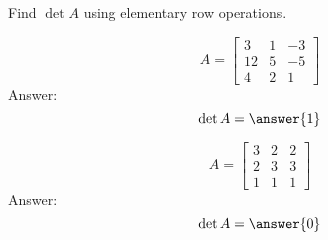 \documentclass{ximera}
\begin{document}
\begin{problem}
Find $\det{A}$ using elementary row operations.

\begin{problem}\label{prob:elemrowopsdet1}
$$A=\begin{bmatrix}3&1&-3\\12&5&-5\\4&2&1\end{bmatrix}$$
Answer:
$$\det{A}=\answer{1}$$
\end{problem}

\begin{problem}\label{prob:elemrowopsdet2}
$$A=\begin{bmatrix}3&2&2\\2&3&3\\1&1&1\end{bmatrix}$$
Answer:
$$\det{A}=\answer{0}$$
\end{problem}

\end{problem}
\end{document}
